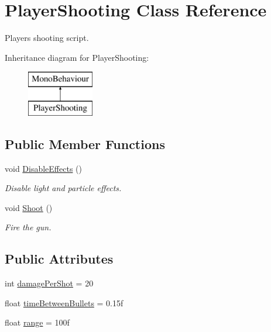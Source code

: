 \hypertarget{class_player_shooting}{}\section{Player\+Shooting Class Reference}
\label{class_player_shooting}


Players shooting script.  


Inheritance diagram for Player\+Shooting\+:\begin{figure}[H]
\begin{center}
\leavevmode
\includegraphics[height=2.000000cm]{class_player_shooting}
\end{center}
\end{figure}
\subsection*{Public Member Functions}
\begin{DoxyCompactItemize}
\item 
void \mbox{\hyperlink{class_player_shooting_a8b6b1ad667dee36a8dc4bcc3ec8b6058}{Disable\+Effects}} ()
\begin{DoxyCompactList}\small\item\em Disable light and particle effects. \end{DoxyCompactList}\item 
void \mbox{\hyperlink{class_player_shooting_a2aec2512314c775757dcf9ad8c7782a4}{Shoot}} ()
\begin{DoxyCompactList}\small\item\em Fire the gun. \end{DoxyCompactList}\end{DoxyCompactItemize}
\subsection*{Public Attributes}
\begin{DoxyCompactItemize}
\item 
int \mbox{\hyperlink{class_player_shooting_a3db5b9ec339a3fae47f07ed9b6fd6250}{damage\+Per\+Shot}} = 20
\item 
float \mbox{\hyperlink{class_player_shooting_a8457818c5a206d64a6065d222eb3809a}{time\+Between\+Bullets}} = 0.\+15f
\item 
float \mbox{\hyperlink{class_player_shooting_aafbfdae6df2cc4edea43a8b5142802ec}{range}} = 100f
\end{DoxyCompactItemize}
